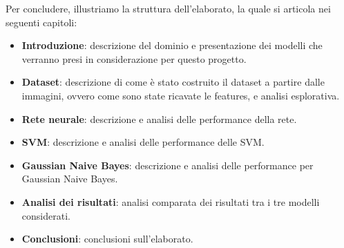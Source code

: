 Per concludere, illustriamo la struttura dell'elaborato, la quale si articola
nei seguenti capitoli:
\begin{itemize}
    \item \textbf{Introduzione}: descrizione del dominio e presentazione dei
          modelli che verranno presi in considerazione per questo progetto.
    \item \textbf{Dataset}: descrizione di come è stato costruito il dataset a
          partire dalle immagini, ovvero come sono state ricavate le features, e
          analisi esplorativa.
    \item \textbf{Rete neurale}: descrizione e analisi delle performance della
          rete.
    \item \textbf{SVM}: descrizione e analisi delle performance delle SVM.
    \item \textbf{Gaussian Naive Bayes}: descrizione e analisi delle performance
          per Gaussian Naive Bayes.
    \item \textbf{Analisi dei risultati}: analisi comparata dei risultati tra i
          tre modelli considerati.
    \item \textbf{Conclusioni}: conclusioni sull'elaborato.
\end{itemize}
